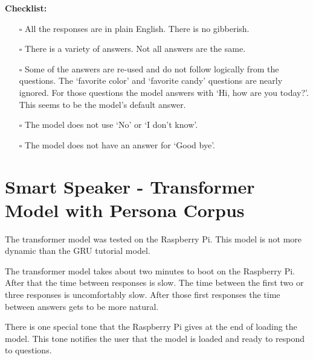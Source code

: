 \noindent \textbf{Checklist:} 

\begin{itemize}
	
	\item[\rlap{\raisebox{0.3ex}{\hspace{0.4ex}\scriptsize \ding{52}}}$\square$] All the responses are in plain English. There is no gibberish.
	
	\item[\rlap{\raisebox{0.3ex}{\hspace{0.4ex}\scriptsize \ding{52}}}$\square$] There is a variety of answers. Not all answers are the same.
	
	\item[\rlap{\raisebox{0.3ex}{\hspace{0.4ex}\scriptsize \ding{56}}}$\square$] Some of the answers are re-used and do not follow logically from the questions. The `favorite color' and `favorite candy' questions are nearly ignored. For those questions the model answers with `Hi, how are you today?'. This seems to be the model's default answer.
	
	\item[\rlap{\raisebox{0.3ex}{\hspace{0.4ex}\scriptsize \ding{52}}}$\square$] The model does not use `No' or `I don't know'.
	
	\item[\rlap{\raisebox{0.3ex}{\hspace{0.4ex}\scriptsize \ding{56}}}$\square$] The model does not have an answer for `Good bye'.
\end{itemize}


\section{Smart Speaker - Transformer Model with Persona Corpus}

The transformer model was tested on the Raspberry Pi. This model is not more dynamic than the GRU tutorial model. 

The transformer model takes about two minutes to boot on the Raspberry Pi. After that the time between responses is slow. The time between the first two or three responses is uncomfortably slow. After those first responses the time between answers gets to be more natural.

There is one special tone that the Raspberry Pi gives at the end of loading the model. This tone notifies the user that the model is loaded and ready to respond to questions.


